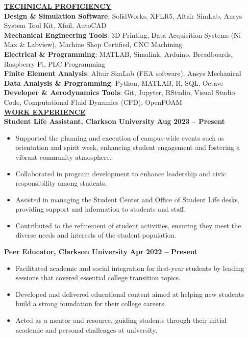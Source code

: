 \documentclass{article}
\begin{document}
\noindent \textbf{\underline{TECHNICAL PROFICIENCY}} \\
\textbf{Design \& Simulation Software}{: \small SolidWorks, XFLR5, Altair SimLab, Ansys System Tool Kit, Xfoil, AutoCAD} \\
\textbf{Mechanical Engineering Tools}{: \small 3D Printing, Data Acquisition Systems (Ni Max \& Labview), Machine Shop Certified, CNC Machining} \\
\textbf{Electrical \& Programming}{: \small MATLAB, Simulink, Arduino, Breadboards, Raspberry Pi, PLC Programming} \\
\textbf{Finite Element Analysis}{: \small Altair SimLab (FEA software), Ansys Mechanical} \\
\textbf{Data Analysis \& Programming}{: \small Python, MATLAB, R, SQL, Octave} \\
\textbf{Developer \& Aerodynamics Tools}{: \small Git, Jupyter, RStudio, Visual Studio Code, Computational Fluid Dynamics (CFD), OpenFOAM} \\


\noindent \textbf{\underline{WORK EXPERIENCE}}\\
\noindent \textbf{Student Life Assistant, Clarkson University} \hfill \textbf{Aug 2023 – Present}
\begin{itemize}[noitemsep,nolistsep,leftmargin=*]
\item {\small Supported the planning and execution of campus-wide events such as orientation and spirit week, enhancing student engagement and fostering a vibrant community atmosphere.}
\item {\small Collaborated in program development to enhance leadership and civic responsibility among students.}
\item {\small Assisted in managing the Student Center and Office of Student Life desks, providing support and information to students and staff.}
\item {\small Contributed to the refinement of student activities, ensuring they meet the diverse needs and interests of the student population.}
\end{itemize}

\noindent \textbf{Peer Educator, Clarkson University} \hfill \textbf{Apr 2022 – Present}
\begin{itemize}[noitemsep,nolistsep,leftmargin=*]
\item {\small Facilitated academic and social integration for first-year students by leading sessions that covered essential college transition topics.}
\item {\small Developed and delivered educational content aimed at helping new students build a strong foundation for their college careers.}
\item {\small Acted as a mentor and resource, guiding students through their initial academic and personal challenges at university.}
\end{itemize}
\end{document}
